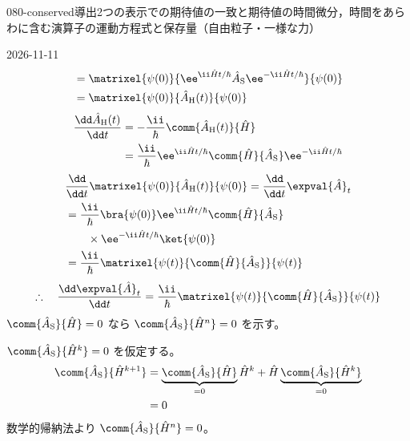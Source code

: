 \documentclass[uplatex,dvipdfmx,a4paper,11pt]{jsarticle}
\begin{document}
\begin{mondai}{080-conserved}{導出}{2つの表示での期待値の一致と期待値の時間微分，時間をあらわに含む演算子の運動方程式と保存量（自由粒子・一様な力）}
\begin{kotaeutsushi}{2026-11-11}
\begin{align*}
&=\matrixel{\psi(0)}{\ee^{\ii\hat{H}t/\hbar}\hat{A}_{\mathrm{S}}\ee^{-\ii\hat{H}t/\hbar}}{\psi(0)}\\
&=\matrixel{\psi(0)}{\hat{A}_{\mathrm{H}}(t)}{\psi(0)}
\end{align*}
\begin{align*}
\frac{\dd\hat{A}_{\mathrm{H}}(t)}{\dd t}&=-\frac{\ii}{\hbar}\comm{\hat{A}_{\mathrm{H}}(t)}{\hat{H}}\\
&=\frac{\ii}{\hbar}\ee^{\ii\hat{H}t/\hbar}\comm{\hat{H}}{\hat{A}_{\mathrm{S}}}\ee^{-\ii\hat{H}t/\hbar}
\end{align*}
\begin{align*}
&\frac{\dd}{\dd t}\matrixel{\psi(0)}{\hat{A}_{\mathrm{H}}(t)}{\psi(0)}=\frac{\dd}{\dd t}\expval{\hat{A}}_{t}\\
&=\frac{\ii}{\hbar}\bra{\psi(0)}\ee^{\ii\hat{H}t/\hbar}\comm{\hat{H}}{\hat{A}_{\mathrm{S}}}\\
&\qquad\times\ee^{-\ii\hat{H}t/\hbar}\ket{\psi(0)}\\
&=\frac{\ii}{\hbar}\matrixel{\psi(t)}{\comm{\hat{H}}{\hat{A}_{\mathrm{S}}}}{\psi(t)}
\end{align*}
\[ \therefore\quad\frac{\dd\expval{\hat{A}}_{t}}{\dd t}=\frac{\ii}{\hbar}\matrixel{\psi(t)}{\comm{\hat{H}}{\hat{A}_{\mathrm{S}}}}{\psi(t)} \]
$\comm{\hat{A}_{\mathrm{S}}}{\hat{H}}=0$ なら $\comm{\hat{A}_{\mathrm{S}}}{\hat{H}^{n}}=0$ を示す。

$\comm{\hat{A}_{\mathrm{S}}}{\hat{H}^{k}}=0$ を仮定する。
\begin{align*}
\comm{\hat{A}_{\mathrm{S}}}{\hat{H}^{k+1}}&=\underbrace{\comm{\hat{A}_{\mathrm{S}}}{\hat{H}}}_{=0}\hat{H}^{k}+\hat{H}\underbrace{\comm{\hat{A}_{\mathrm{S}}}{\hat{H}^{k}}}_{=0}\\
&=0
\end{align*}
数学的帰納法より $\comm{\hat{A}_{\mathrm{S}}}{\hat{H}^{n}}=0$。


\end{kotaeutsushi}
\end{mondai}
\end{document}
